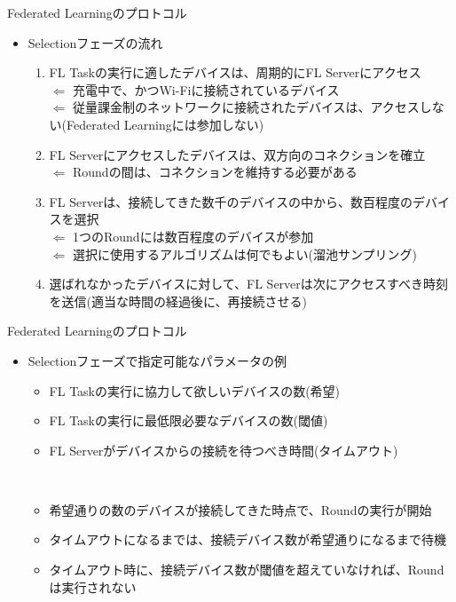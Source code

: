\documentclass[dvipdfmx,notheorems,t]{beamer}
\begin{document}
\begin{frame}{Federated Learningのプロトコル}

\begin{itemize}
	\item Selectionフェーズの流れ
	\begin{enumerate}
		\item FL Taskの実行に適したデバイスは、周期的にFL Serverにアクセス \\
		$\Leftarrow$ \alert{充電中}で、かつ\alert{Wi-Fi}に接続されているデバイス \\
		$\Leftarrow$ 従量課金制のネットワークに接続されたデバイスは、アクセスしない(Federated Learningには参加しない)
		\newline
		
		\item FL Serverにアクセスしたデバイスは、双方向のコネクションを確立 \\
		$\Leftarrow$ Roundの間は、コネクションを維持する必要がある
		\newline
		
		\item FL Serverは、接続してきた数千のデバイスの中から、数百程度のデバイスを選択 \\
		$\Leftarrow$ 1つのRoundには数百程度のデバイスが参加 \\
		$\Leftarrow$ 選択に使用するアルゴリズムは何でもよい(溜池サンプリング)
		\newline
		
		\item 選ばれなかったデバイスに対して、FL Serverは次にアクセスすべき時刻を送信(適当な時間の経過後に、再接続させる)
	\end{enumerate}
\end{itemize}

\end{frame}

\begin{frame}{Federated Learningのプロトコル}

\begin{itemize}
	\item Selectionフェーズで指定可能なパラメータの例
	\begin{itemize}
		\item FL Taskの実行に協力して欲しいデバイスの数(希望)
		\item FL Taskの実行に最低限必要なデバイスの数(閾値)
		\item FL Serverがデバイスからの接続を待つべき時間(タイムアウト)
	\end{itemize} \
	
	\begin{itemize}
		\item 希望通りの数のデバイスが接続してきた時点で、Roundの実行が開始
		\item タイムアウトになるまでは、接続デバイス数が希望通りになるまで待機
		\newline
		\item タイムアウト時に、接続デバイス数が閾値を超えていなければ、Roundは実行されない
	\end{itemize}
\end{itemize}

\end{frame}
\end{document}

